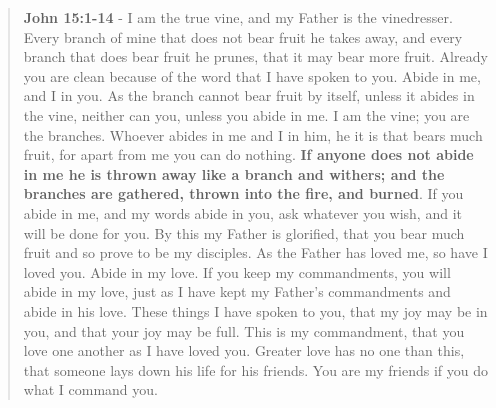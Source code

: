 \documentclass[11pt]{article}
\begin{document}
\begin{quote}
\textbf{John 15:1-14} - I am the true vine, and my Father is the vinedresser. Every branch of mine that does not bear fruit he takes away, and every branch that does bear fruit he prunes, that it may bear more fruit. Already you are clean because of the word that I have spoken to you. Abide in me, and I in you. As the branch cannot bear fruit by itself, unless it abides in the vine, neither can you, unless you abide in me. I am the vine; you are the branches. Whoever abides in me and I in him, he it is that bears much fruit, for apart from me you can do nothing. \textbf{If anyone does not abide in me he is thrown away like a branch and withers; and the branches are gathered, thrown into the fire, and burned}. If you abide in me, and my words abide in you, ask whatever you wish, and it will be done for you. By this my Father is glorified, that you bear much fruit and so prove to be my disciples. As the Father has loved me, so have I loved you. Abide in my love. If you keep my commandments, you will abide in my love, just as I have kept my Father's commandments and abide in his love. These things I have spoken to you, that my joy may be in you, and that your joy may be full. This is my commandment, that you love one another as I have loved you. Greater love has no one than this, that someone lays down his life for his friends. You are my friends if you do what I command you.
\end{quote}
\end{document}
